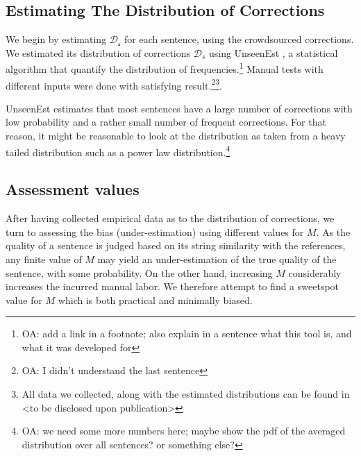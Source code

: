 \documentclass[english]{article}
\newcommand{\oa}[1]{\footnote{\color{red}OA: #1}}
\begin{document}
\subsection{Estimating The Distribution of Corrections}

We begin by estimating $\mathcal{D_s}$ for each sentence, using the crowdsourced
corrections. We estimated its distribution of corrections $\mathcal{D}_s$
using {\sc UnseenEst} \cite{zou2015quantifying}, a statistical algorithm that quantify
the distribution of frequencies.\oa{add a link in a footnote; also explain in a sentence what this tool is, and what it was developed for} Manual tests with different inputs were done with satisfying result.\oa{I didn't understand the last sentence}\footnote{All data we collected, along with the estimated distributions can be found in <to be disclosed upon publication>}.

{\sc UnseenEst} estimates that most sentences have a large number of corrections with low probability and a rather small number of frequent corrections. For that reason, it might be reasonable to look at the distribution as taken from a heavy tailed distribution such as a power law distribution.\oa{we need some more numbers here; maybe show the pdf of the averaged distribution over all sentences? or something else?}

\subsection{Assessment values}\label{subsec:Assessment-values}

After having collected empirical data as to the distribution of corrections,
we turn to assessing the bias (under-estimation) using  different values for $M$.
As the quality of a sentence is judged based on its string similarity with the references,
any finite value of $M$ may yield an under-estimation of the true quality of the sentence, 
with some probability. On the other hand, increasing $M$ considerably increases the incurred
manual labor. We therefore attempt to find a sweetspot value for $M$ which is both practical
and minimally biased.


 
\end{document}
